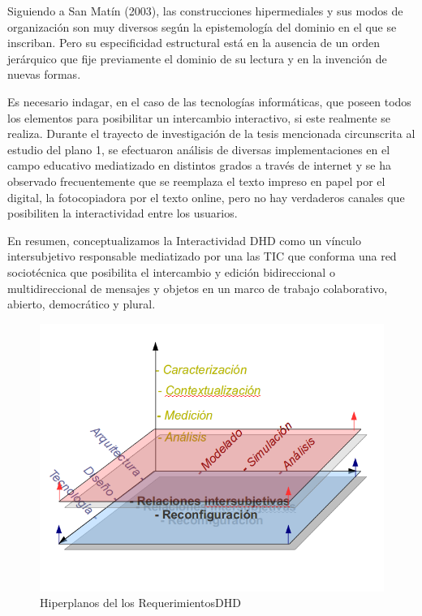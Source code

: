 Siguiendo a San Matín (2003), las construcciones hipermediales y sus modos de organización son muy
diversos según la epistemología del dominio en el que se inscriban. Pero su
especificidad estructural está en la ausencia de un orden jerárquico que fije
previamente el dominio de su lectura y en la invención de nuevas formas.

Es necesario indagar, en el caso de las tecnologías informáticas, que
poseen todos los elementos para posibilitar un intercambio interactivo, si este
realmente se realiza. Durante el trayecto de investigación de la tesis mencionada
circunscrita al estudio del plano 1, se efectuaron análisis de diversas
implementaciones en el campo educativo mediatizado en distintos grados a través de internet y se ha
observado frecuentemente que se reemplaza el texto impreso en papel por
el digital, la fotocopiadora por el texto online, pero no hay verdaderos canales
que posibiliten la interactividad entre los usuarios.


\begin{defi}  En resumen, conceptualizamos la Interactividad DHD
como un vínculo intersubjetivo responsable mediatizado por una las TIC que conforma una red sociotécnica que posibilita el
intercambio y edición bidireccional o multidireccional de mensajes y objetos en un marco de trabajo
colaborativo, abierto, democrático y plural.
\end{defi} \label{interactividadDHD}


\begin{figure}
\begin{center}
 \includegraphics[width=4 in,totalheight=3 in] {DHD/hiperplanosDHD}
\caption{Hiperplanos del los RequerimientosDHD} \label{hiperplanos}
\end{center}
\end{figure}


